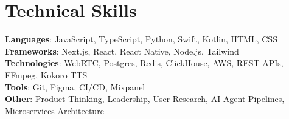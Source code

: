 \documentclass[letterpaper,11pt]{article}
\begin{document}
\section{Technical Skills}
\begin{itemize}[leftmargin=0.15in, label={}]
\small{\item{
\textbf{Languages}{: JavaScript, TypeScript, Python, Swift, Kotlin, HTML, CSS} \\
\textbf{Frameworks}{: Next.js, React, React Native, Node.js, Tailwind} \\
\textbf{Technologies}{: WebRTC, Postgres, Redis, ClickHouse, AWS, REST APIs, FFmpeg, Kokoro TTS} \\
\textbf{Tools}{: Git, Figma, CI/CD, Mixpanel} \\
\textbf{Other}{: Product Thinking, Leadership, User Research, AI Agent Pipelines, Microservices Architecture}
}}
\end{itemize}
\end{document}
